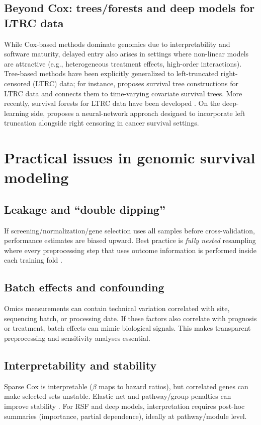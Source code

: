 \documentclass[11pt]{article}
\begin{document}
\subsection{Beyond Cox: trees/forests and deep models for LTRC data}
While Cox-based methods dominate genomics due to interpretability and software maturity, delayed entry also arises in settings where non-linear models are attractive (e.g., heterogeneous treatment effects, high-order interactions).
Tree-based methods have been explicitly generalized to left-truncated right-censored (LTRC) data; for instance, \citet{FuSimonoff2016} proposes survival tree constructions for LTRC data and connects them to time-varying covariate survival trees.
More recently, survival forests for LTRC data have been developed \citep{LaurentVoVan2024}.
On the deep-learning side, \citet{Seo2025} proposes a neural-network approach designed to incorporate left truncation alongside right censoring in cancer survival settings.

\section{Practical issues in genomic survival modeling}
\subsection{Leakage and ``double dipping''}
If screening/normalization/gene selection uses all samples before cross-validation, performance estimates are biased upward. Best practice is \emph{fully nested} resampling where every preprocessing step that uses outcome information is performed inside each training fold \citep{vanWieringen2009}.

\subsection{Batch effects and confounding}
Omics measurements can contain technical variation correlated with site, sequencing batch, or processing date. If these factors also correlate with prognosis or treatment, batch effects can mimic biological signals. This makes transparent preprocessing and sensitivity analyses essential.


\subsection{Interpretability and stability}
Sparse Cox is interpretable ($\beta$ maps to hazard ratios), but correlated genes can make selected sets unstable. Elastic net and pathway/group penalties can improve stability \citep{Simon2011}. For RSF and deep models, interpretation requires post-hoc summaries (importance, partial dependence), ideally at pathway/module level.
\end{document}
